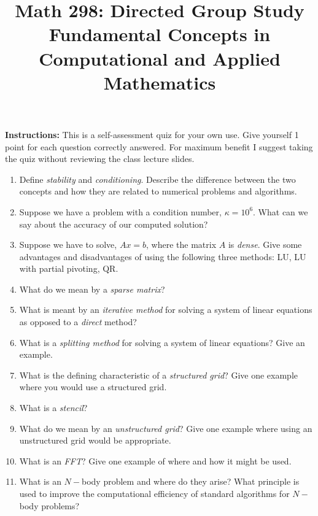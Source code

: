 \documentclass[11pt]{article}
\title{Math 298: Directed Group Study\\ {\normalsize Fundamental Concepts in Computational and Applied Mathematics }}
\begin{document}
\maketitle
{\bf Instructions:} This is a self-assessment quiz for your own use.  Give yourself 1 point for each question correctly answered.  For maximum benefit I suggest taking the quiz without reviewing the class lecture slides.  
\vspace{.25in}
\begin{enumerate}
\item Define {\it stability} and {\it conditioning}.  Describe the difference between the two concepts and how they are related to numerical problems and algorithms. 
\vspace{2.5in}
\item Suppose we have a problem with a condition number, $\kappa = 10^6$.  What can we say about the accuracy of our computed solution?
\vspace{2.5in}
\item Suppose we have to solve, $Ax=b$, where the matrix $A$ is {\it dense}.  Give some advantages and disadvantages of using the following three methods: LU, LU with partial pivoting, QR.
\vspace{2.5in}
\item What do we mean by a {\it sparse matrix}?
\vspace{2.5in}
\item What is meant by an {\it iterative method}  for solving a system of linear equations as opposed to a {\it direct} method?
\vspace{2.5in}
\item What is a {\it splitting method} for solving a system of linear equations? Give an example.
\vspace{2.5in}
\item What is the defining characteristic of a {\it structured grid}?  Give one example where you would use a structured grid.
\vspace{2.5in}
\item What is a {\it stencil}?  
\vspace{2.5in}
\item What do we mean by an {\it unstructured grid}?   Give one example where using an unstructured grid would be appropriate.
\vspace{2.5in}
\item What is an {\it FFT}?  Give one example of where and how it might be used.
\vspace{2.5in}
\item What is an $N-$body problem and where do they arise? What principle is used to improve the computational efficiency of standard algorithms for $N-$body problems?

\end{enumerate}
\end{document}
